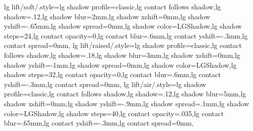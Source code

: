{  lg lift/soft/.style={lg shadow profile=classic,lg contact follows shadow,lg shadow=.12,lg shadow blur=2mm,lg shadow xshift=0mm,lg shadow yshift=-.65mm,lg shadow spread=0mm,lg shadow color=LGShadow,lg shadow steps=24,lg contact opacity=0,lg contact blur=.6mm,lg contact yshift=-.3mm,lg contact spread=0mm},
  lg lift/raised/.style={lg shadow profile=classic,lg contact follows shadow,lg shadow=.18,lg shadow blur=3mm,lg shadow xshift=0mm,lg shadow yshift=-1mm,lg shadow spread=0mm,lg shadow color=LGShadow,lg shadow steps=32,lg contact opacity=0,lg contact blur=.6mm,lg contact yshift=-.3mm,lg contact spread=0mm},
  lg lift/air/.style={lg shadow profile=classic,lg contact follows shadow,lg shadow=.12,lg shadow blur=5mm,lg shadow xshift=0mm,lg shadow yshift=-.9mm,lg shadow spread=.1mm,lg shadow color=LGShadow,lg shadow steps=40,lg contact opacity=.035,lg contact blur=.65mm,lg contact yshift=-.3mm,lg contact spread=0mm},
}
\endinput
